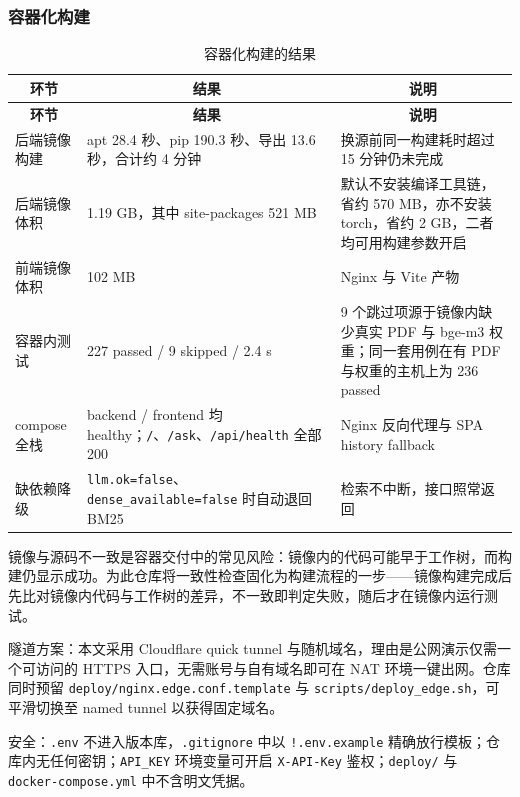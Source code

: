\documentclass[UTF8,fontset=windows,zihao=5,a4paper]{ctexart}
\begin{document}
\subsubsection*{容器化构建}
\begin{longtable}{@{}p{}p{}p{}@{}}
\caption{容器化构建的结果}\\
\toprule
\multicolumn{1}{c}{\textbf{环节}} & \multicolumn{1}{c}{\textbf{结果}} & \multicolumn{1}{c}{\textbf{说明}} \\
\midrule
\endfirsthead
\toprule
\multicolumn{1}{c}{\textbf{环节}} & \multicolumn{1}{c}{\textbf{结果}} & \multicolumn{1}{c}{\textbf{说明}} \\
\midrule
\endhead
\bottomrule
\endfoot
后端镜像构建 & apt 28.4 秒、pip 190.3 秒、导出 13.6 秒，合计约 4 分钟 & 换源前同一构建耗时超过 15 分钟仍未完成 \\
后端镜像体积 & 1.19 GB，其中 site-packages 521 MB & 默认不安装编译工具链，省约 570 MB，亦不安装 torch，省约 2 GB，二者均可用构建参数开启 \\
前端镜像体积 & 102 MB & Nginx 与 Vite 产物 \\
容器内测试 & 227 passed / 9 skipped / 2.4 s & 9 个跳过项源于镜像内缺少真实 PDF 与 bge-m3 权重；同一套用例在有 PDF 与权重的主机上为 236 passed \\
compose 全栈 & backend / frontend 均 healthy；\texttt{/}、\texttt{/ask}、\texttt{/api/health} 全部 200 & Nginx 反向代理与 SPA history fallback \\
缺依赖降级 & \texttt{llm.ok=false}、\texttt{dense\_\allowbreak{}available=false} 时自动退回 BM25 & 检索不中断，接口照常返回 \\
\end{longtable}

镜像与源码不一致是容器交付中的常见风险：镜像内的代码可能早于工作树，而构建仍显示成功。为此仓库将一致性检查固化为构建流程的一步——镜像构建完成后先比对镜像内代码与工作树的差异，不一致即判定失败，随后才在镜像内运行测试。

隧道方案：本文采用 Cloudflare quick tunnel 与随机域名，理由是公网演示仅需一个可访问的 HTTPS 入口，无需账号与自有域名即可在 NAT 环境一键出网。仓库同时预留 \texttt{deploy/nginx.edge.conf.template} 与 \texttt{scripts/deploy\_\allowbreak{}edge.sh}，可平滑切换至 named tunnel 以获得固定域名。

安全：\texttt{.env} 不进入版本库，\texttt{.gitignore} 中以 \texttt{!.env.example} 精确放行模板；仓库内无任何密钥；\texttt{API\_\allowbreak{}KEY} 环境变量可开启 \texttt{X-API-Key} 鉴权；\texttt{deploy/} 与 \texttt{docker-compose.yml} 中不含明文凭据。
\end{document}
